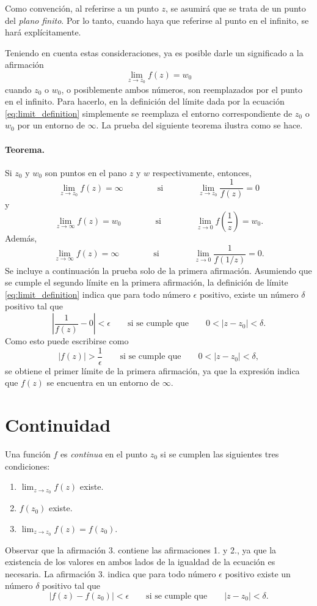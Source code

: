 \documentclass[a4paper]{report}
\begin{document}
Como convención, al referirse a un punto \(z\), se asumirá que se trata de un punto del \emph{plano finito}. Por lo tanto, cuando haya que referirse al punto en el infinito, se hará explícitamente.

Teniendo en cuenta estas consideraciones, ya es posible darle un significado a la afirmación
\[
 \lim_{z\to z_0} f(z)=w_0
\]
cuando \(z_0\) o \(w_0\), o posiblemente ambos números, son reemplazados por el punto en el infinito. Para hacerlo, en la definición del límite dada por la ecuación \ref{eq:limit_definition} simplemente se reemplaza el entorno correspondiente de \(z_0\) o \(w_0\) por un entorno de \(\infty\). La prueba del siguiente teorema ilustra como se hace.

\paragraph{Teorema.} Si \(z_0\) y \(w_0\) son puntos en el pano \(z\) y \(w\) respectivamente, entonces,
\[
 \lim_{z\to z_0} f(z)=\infty
  \qquad\qquad\textrm{si}\qquad\qquad
 \lim_{z\to z_0} \frac{1}{f(z)}=0 
\]
y
\[
 \lim_{z\to \infty} f(z)=w_0
  \qquad\qquad\textrm{si}\qquad\qquad
 \lim_{z\to 0}f\left(\frac{1}{z}\right)=w_0. 
\]
Además,
\[
 \lim_{z\to \infty} f(z)=\infty
  \qquad\qquad\textrm{si}\qquad\qquad
 \lim_{z\to 0}\frac{1}{f(1/z)}=0. 
\]
Se incluye a continuación la prueba solo de la primera afirmación. Asumiendo que se cumple el segundo límite en la primera afirmación, la definición de límite \ref{eq:limit_definition} indica que para todo número \(\epsilon\) positivo, existe un número \(\delta\) positivo tal que 
\[
 \left|\frac{1}{f(z)}-0\right|<\epsilon
 \qquad\textrm{si se cumple que}\qquad
 0<|z-z_0|<\delta.
\]
Como esto puede escribirse como
\[
 |f(z)|>\frac{1}{\epsilon}
 \qquad\textrm{si se cumple que}\qquad
 0<|z-z_0|<\delta,
\]
se obtiene el primer límite de la primera afirmación, ya que la expresión indica que \(f(z)\) se encuentra en un entorno de \(\infty\).

\section{Continuidad}\label{sec:continuity_definition}

Una función \(f\) es \emph{continua} en el punto \(z_0\) si se cumplen las siguientes tres condiciones:
\begin{enumerate}
 \item \(\displaystyle\lim_{z\to z_0}f(z)\) existe.
 \item \(\displaystyle f(z_0)\) existe.
 \item \(\displaystyle\lim_{z\to z_0}f(z)=f(z_0)\).
\end{enumerate}
Observar que la afirmación 3. contiene las afirmaciones 1. y 2., ya que la existencia de los valores en ambos lados de la igualdad de la ecuación es necesaria. La afirmación 3. indica que para todo número \(\epsilon\) positivo existe un número \(\delta\) positivo tal que
\begin{equation}\label{eq:continuity_definition}
 |f(z)-f(z_0)|<\epsilon
 \qquad\textrm{si se cumple que}\qquad
 |z-z_0|<\delta.
\end{equation}
\end{document}
